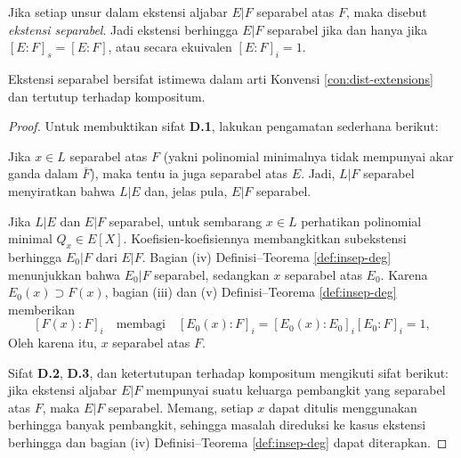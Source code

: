 \begin{definition}
	Jika setiap unsur dalam ekstensi aljabar $E|F$ separabel atas $F$, maka disebut \emph{ekstensi separabel}. Jadi ekstensi berhingga $E|F$ separabel jika dan hanya jika $[E:F]_s = [E:F]$, atau secara ekuivalen $[E:F]_i = 1$.
\end{definition}

\begin{proposition}\label{prop:sep-ext-dist}
	Ekstensi separabel bersifat istimewa dalam arti Konvensi \ref{con:dist-extensions} dan tertutup terhadap kompositum.
\end{proposition}
\begin{proof}
	Untuk membuktikan sifat \textbf{D.1}, lakukan pengamatan sederhana berikut:
	\begin{compactitem}
		\item Jika $x \in L$ separabel atas $F$ (yakni polinomial minimalnya tidak mempunyai akar ganda dalam $\overline{F}$), maka tentu ia juga separabel atas $E$. Jadi, $L|F$ separabel menyiratkan bahwa $L|E$ dan, jelas pula, $E|F$ separabel.
		\item Jika $L|E$ dan $E|F$ separabel, untuk sembarang $x \in L$ perhatikan polinomial minimal $Q_x \in E[X]$. Koefisien-koefisiennya membangkitkan subekstensi berhingga $E_0|F$ dari $E|F$. Bagian (iv) Definisi--Teorema \ref{def:insep-deg} menunjukkan bahwa $E_0|F$ separabel, sedangkan $x$ separabel atas $E_0$. Karena $E_0(x) \supset F(x)$, bagian (iii) dan (v) Definisi--Teorema \ref{def:insep-deg} memberikan
			\[ [F(x):F]_i \quad \text{membagi} \quad [E_0(x):F]_i = [E_0(x):E_0]_i [E_0:F]_i = 1, \]
			Oleh karena itu, $x$ separabel atas $F$.
	\end{compactitem}
	Sifat \textbf{D.2}, \textbf{D.3}, dan ketertutupan terhadap kompositum mengikuti sifat berikut: jika ekstensi aljabar $E|F$ mempunyai suatu keluarga pembangkit yang separabel atas $F$, maka $E|F$ separabel. Memang, setiap $x$ dapat ditulis menggunakan berhingga banyak pembangkit, sehingga masalah direduksi ke kasus ekstensi berhingga dan bagian (iv) Definisi--Teorema \ref{def:insep-deg} dapat diterapkan.
\end{proof}

